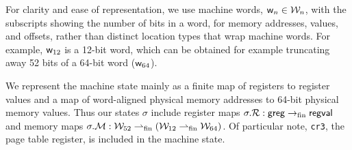 For clarity and ease of representation, we use machine words, $\mathsf{w}_n \in \mathcal{W}_n$, with the subscripts showing the number of bits in a word,
for memory addresses, values, and offsets, rather than distinct location types that wrap machine words.
For example, $\mathsf{w}_{12}$ is a 12-bit word, which can be obtained for example truncating away 52 bits of a 64-bit word ($\mathsf{w}_{64}$).

\label{sec:state}
We represent the machine state mainly as a finite map of registers to register values and a map of word-aligned physical memory addresses 
to 64-bit physical memory values. 
Thus our states $\sigma$ include register maps $\sigma.\mathcal{R}: \mathsf{greg} \rightarrow_{\textrm{fin}} \mathsf{regval} $ and
memory maps $\sigma.\mathcal{M}: \mathcal{W}_{52} \rightharpoonup_{\textrm{fin}} (\mathcal{W}_{12} \rightharpoonup_{\textrm{fin}} \mathcal{W}_{64} )$.
Of particular note, \lstinline|cr3|, the page table register, is included in the machine state.


\label{sec:instructions}

